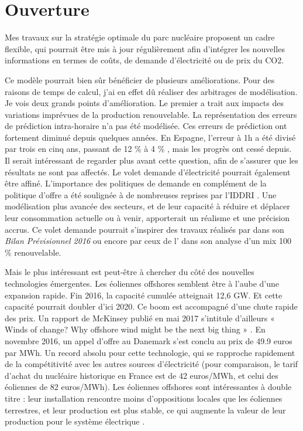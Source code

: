 \section{Ouverture}

Mes travaux sur la stratégie optimale du parc nucléaire proposent un cadre flexible, qui pourrait être mis à jour régulièrement afin d’intégrer les nouvelles informations en termes de coûts, de demande d’électricité ou de prix du CO2. 

Ce modèle pourrait bien sûr bénéficier de plusieurs améliorations. Pour des raisons de temps de calcul, j’ai en effet dû réaliser des arbitrages de modélisation. Je vois deux grands points d’amélioration. Le premier a trait aux impacts des variations imprévues de la production renouvelable. La représentation des erreurs de prédiction intra-horaire n’a pas été modélisée. Ces erreurs de prédiction ont fortement diminué depuis quelques années. En Espagne, l’erreur à 1h a été divisé par trois en cinq ans, passant de 12 \% à 4 \% \citep{IRENA2017}, mais les progrès ont cessé depuis. Il serait intéressant de regarder plus avant cette question, afin de s’assurer que les résultats ne sont pas affectés. Le volet demande d’électricité pourrait également être affiné. L’importance des politiques de demande en complément de la politique d’offre a été soulignée à de nombreuses reprises par l’IDDRI \citep{Berghmans2017}. Une modélisation plus avancée des secteurs, et de leur capacité à réduire et déplacer leur consommation actuelle ou à venir, apporterait un réalisme et une précision accrus. Ce volet demande pourrait s'inspirer des travaux réalisés par \citet{RTE2016} dans son \textit{Bilan Prévisionnel 2016} ou encore par ceux de l'\citet{ADEME2015} dans son analyse d'un mix 100 \% renouvelable.

Mais le plus intéressant est peut-être à chercher du côté des nouvelles technologies émergentes. 
Les éoliennes offshores semblent être à l’aube d’une expansion rapide. Fin 2016, la capacité cumulée atteignait 12,6 GW. Et cette capacité pourrait doubler d’ici 2020. Ce boom est accompagné d’une chute rapide des prix. Un rapport de McKinsey publié en mai 2017 s’intitule d’ailleurs « Winds of change? Why offshore wind might be the next big thing » \citep{McKinsey2017Wind}. En novembre 2016, un appel d’offre au Danemark s’est conclu au prix de 49.9 euros par MWh. Un record absolu pour cette technologie, qui se rapproche rapidement de la compétitivité avec les autres sources d’électricité (pour comparaison, le tarif d'achat du nucléaire historique en France est de 42 euros/MWh, et celui des éoliennes de 82 euros/MWh). Les éoliennes offshores sont intéressantes à double titre : leur installation rencontre moins d’oppositions locales que les éoliennes terrestres, et leur production est plus stable, ce qui augmente la valeur de leur production pour le système électrique \citep{Hirth2016}.

